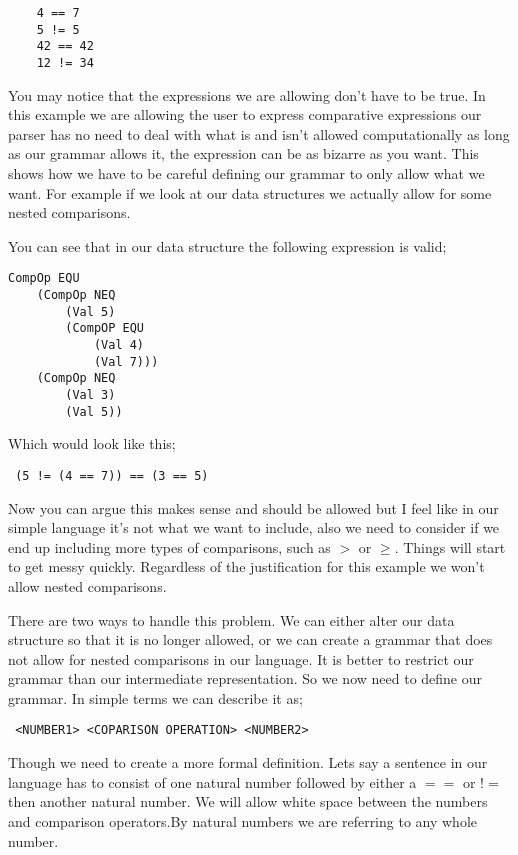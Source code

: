 \begin{lstlisting}
	4 == 7
	5 != 5
	42 == 42
	12 != 34 
\end{lstlisting}

You may notice that the expressions we are allowing don't have to be true. In this example we are allowing the user to express comparative expressions our parser has no need to deal with what is and isn't allowed computationally as long as our grammar allows it, the expression can be as bizarre as you want. This shows how we have to be careful defining our grammar to only allow what we want. For example if we look at our data structures we actually allow for some nested comparisons.

\newpage

You can see that in our data structure the following expression is valid;

\begin{lstlisting}
CompOp EQU 
	(CompOp NEQ 
		(Val 5) 
		(CompOP EQU 
			(Val 4)
			(Val 7))) 
	(CompOp NEQ 
		(Val 3) 
		(Val 5))
\end{lstlisting}

Which would look like this;

\begin{lstlisting}
 (5 != (4 == 7)) == (3 == 5)
\end{lstlisting}

Now you can argue this makes sense and should be allowed but I feel like in our simple language it's not what we want to include, also we need to consider if we end up including more types of comparisons, such as $>$ or $\geq$. Things will start to get messy quickly. Regardless of the justification for this example we won't allow nested comparisons. 

There are two ways to handle this problem. We can either alter our data structure so that it is no longer allowed, or we can create a grammar that does not allow for nested comparisons in our language. It is better to restrict our grammar than our intermediate representation. So we now need to define our grammar. In simple terms we can describe it as;

\begin{lstlisting}
 <NUMBER1> <COPARISON OPERATION> <NUMBER2>
\end{lstlisting}   	

Though we need to create a more formal definition. Lets say a sentence in our language has to consist of one natural number followed by either a $==$ or $!=$ then another natural number. We will allow white space between the numbers and comparison operators.By natural numbers we are referring to any whole number. 

